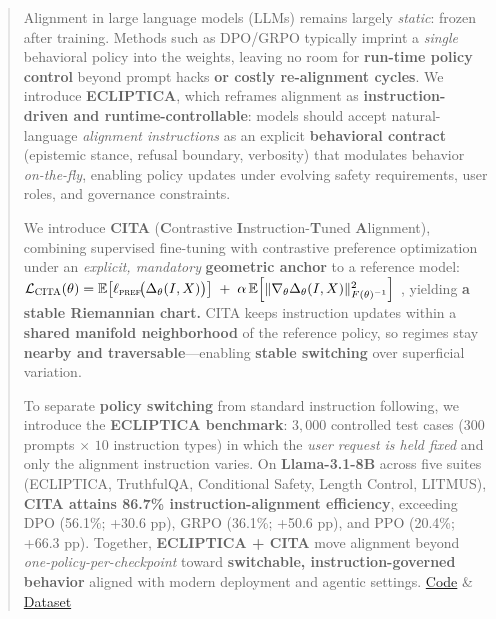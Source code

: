 \documentclass{article}
\begin{document}
\begin{abstract}
\vspace{-1.5mm}
Alignment in large language models (LLMs) remains largely \emph{static}: frozen after training. Methods such as DPO/GRPO typically imprint a \emph{single} behavioral policy into the weights, leaving no room for \textbf{run-time policy control} beyond prompt hacks \textbf{or costly re-alignment cycles}. We introduce \textbf{ECLIPTICA}, which reframes alignment as \textbf{instruction-driven and runtime-controllable}: models should accept natural-language \emph{alignment instructions} as an explicit \textbf{behavioral contract} (epistemic stance, refusal boundary, verbosity) that modulates behavior \emph{on-the-fly}, enabling policy updates under evolving safety requirements, user roles, and governance constraints.


We introduce \textbf{CITA} (\textbf{C}ontrastive \textbf{I}nstruction-\textbf{T}uned \textbf{A}lignment), combining supervised fine-tuning with contrastive preference optimization under an \emph{explicit, mandatory} \textbf{geometric anchor} to a reference model:
\(
\mathcal{L}_{\textsc{CITA}}(\theta)
=
\mathbb{E}\!\left[\ell_{\textsc{pref}}\!\big(\Delta_\theta(I,X)\big)\right]
\;+\;
\alpha\,\mathbb{E}\!\left[\|\nabla_\theta \Delta_\theta(I,X)\|_{F(\theta)^{-1}}^{2}\right]
\)
, yielding \textbf{a stable Riemannian chart.} CITA keeps instruction updates within a \textbf{shared manifold neighborhood} of the reference policy, so regimes stay \textbf{nearby and traversable}—enabling \textbf{stable switching} over superficial variation.












To separate \textbf{policy switching} from standard instruction following, we introduce the \textbf{ECLIPTICA benchmark}: $3{,}000$ controlled test cases ($300$ prompts $\times$ $10$ instruction types) in which the \emph{user request is held fixed} and only the alignment instruction varies. On \textbf{Llama-3.1-8B} across five suites (ECLIPTICA, TruthfulQA, Conditional Safety, Length Control, LITMUS), \textbf{CITA attains \colorbox{bg-green}{86.7\%} instruction-alignment efficiency}, exceeding DPO (56.1\%; +30.6 pp), GRPO (36.1\%; +50.6 pp), and PPO (20.4\%; +66.3 pp). Together, \textbf{ECLIPTICA + CITA} move alignment beyond \emph{one-policy-per-checkpoint} toward \textbf{switchable, instruction-governed behavior} aligned with modern deployment and agentic settings. \href{https://anonymous.4open.science/r/CITA_Anonymous-AC02}{Code} \& \href{https://huggingface.co/datasets/anonymousML123/ISD-Instruction-Switch-Dataset}{Dataset}

\end{abstract}
\end{document}
